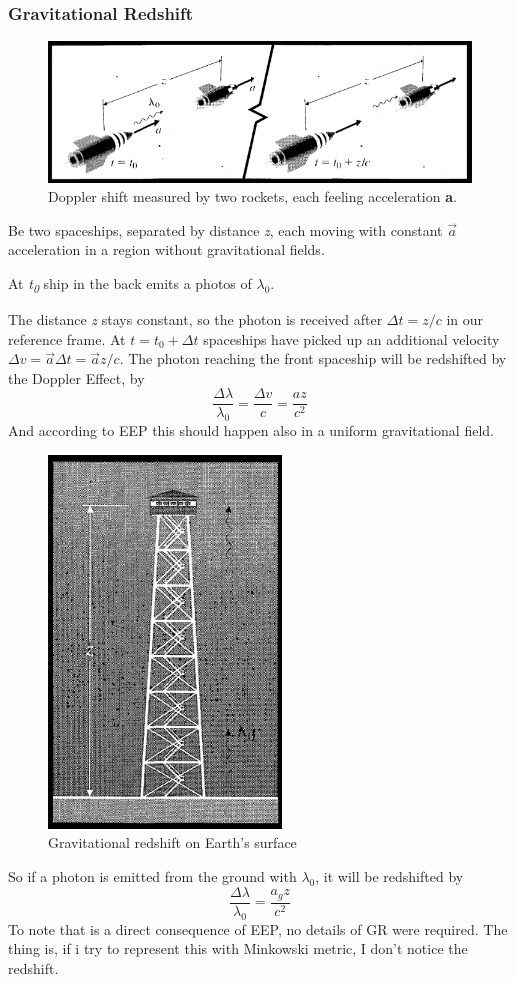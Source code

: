 \subsubsection{Gravitational Redshift}
\begin{figure}[h]
\centering
\includegraphics[width=0.8\linewidth]{imm/gravshift1.png}
\caption{Doppler shift measured by two rockets, each feeling acceleration \textbf{a}.}
\label{imm:gravshift1.png}
\end{figure}

Be two spaceships, separated by distance \emph{z}, each moving with constant $\vec{a}$ acceleration in a region without gravitational fields. \par
At \emph{t\textsubscript{0}} ship in the back emits a photos of $\lambda_{0}$.\par
The distance \emph{z} stays constant, so the photon is received after $\Delta t = z/c$ in our reference frame. At $t = t_{0}+ \Delta t$ spaceships have picked up an additional velocity $\Delta v = \vec{a}\Delta t = \vec{a}z/c$. The photon reaching the front spaceship will be redshifted by the Doppler Effect, by \[
\frac{\Delta \lambda }{\lambda_{0}} = \frac{\Delta v}{c} = \frac{a z}{c^{2}}
\]
And according to EEP this should happen also in a uniform gravitational field.\par
\begin{figure}[h]
\centering
\includegraphics[width=0.3\linewidth]{imm/gravshift2.png}
\caption{Gravitational redshift on Earth's surface}
\label{imm:gravshift2}
\end{figure}
So if a photon is emitted from the ground with $\lambda_{0}$, it will be redshifted by
\[
\frac{\Delta  \lambda }{\lambda_{0}} = \frac{a_{g}z}{c^{2}}
\]
To note that is a direct consequence of EEP, no details of GR were required.
The thing is, if i try to represent this with Minkowski metric, I don't notice the redshift.

